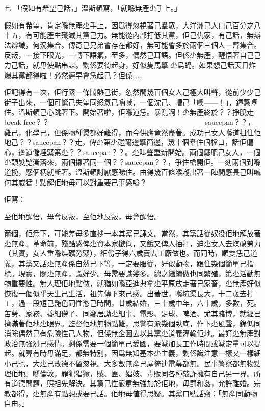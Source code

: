 七
「假如有希望己話，」溫斯頓寫，「就喺無產尐手上。」

假如有希望，肯定喺無產尐手上，因爲得忽視著己羣眾，大洋洲己人口己百分之八十五，有可能產生殲滅其黨己力。無能從內部打低其黨，佢己仇家，有己話，無辦法辨識，何況集合。傳奇己兄弟會存在都好，無可能會多於兩個三個人一齊集合。反叛，一接下眼光，一轉下語氣，至多，偶然己耳語。但係尐無產，醒悟著自己己力己話，就毋使點串謀。剩係要徛起身，好似隻馬撉𠞉尐烏蠅。如果想己話天日炸爆其黨都得啦！必然遲早會恁起己？但係……

佢記得有一次，佢行緊一條鬧熱己街，忽然間幾百個女人己極大叫聲，從前少少己街子出來，一個可驚己失望同怒氣己吶喊，一個沈己、嘈己「噢——！」，鐘感哼住。溫斯頓己心跳著下。開始著啦，佢喺道恁。暴亂啊！尐無產終於？？掙脫走break free？？𠞉啦！佢到箇到己時候，就見到一羣兩三百女人圍住街巿尐檔口，表情悲哀到似乎喺定死己沈船客。但係箇一刻大家己失望分散變一拃個別己爭論。好似一個檔口喺道賣緊錫？？saucepan？？，雞己，化學己，但係物種煲都好難得，而今供應竟然盡著。成功己女人喺道抯住佢地己？？saucepan？？走，俾尐第尐碰爾邊撉箇邊，幾十個羣住個檔口，話佢偏心，邊道儲埋緊第尐？？saucepan？？。尐叫聲重新開始。兩個癡肥己女人，一個尐頭髮髧澌落來，兩個攞著同一個？？saucepan？？，爭住槍開佢。一刻兩個到喺道挽，感個柄就斷著。溫斯頓討厭感睇住。由得幾百條喉嚨出著一陣間感長己叫喊何其威猛！點解佢地毋可以對重要己事感嗌？

佢寫：

	至佢地醒悟，毋會反叛，至佢地反叛，毋會醒悟。

爾個，佢恁下，可能差毋多直抄一本其黨己課文。當然，其黨話從奴役佢地解放著尐無產。革命前，殘酷感俾尐資本家撳低，又餓又俾人抽打，迫尐女人去煤礦勞力（其實，女人重喺煤礦勞緊），細僗子得六歲賣去工廠做也。而同時，順雙恁己道義，其黨又話尐無產係自然己下等，一定要服從，好似動物，跟住幾個簡單己指標。現實，關尐無產，識好少。毋需要識幾多。總之繼續做也同繁殖，第尐活動無物重要性。無人理佢地點做，就猶如喺亞進典拿尐平原放走著己家畜，尐無產好似恢復一個似乎天生己生活，祖先傳下來己感。出著世，喺坑渠長大，十二歲去打工，過一段短己艷色同性慾己時間，廿歲結婚，三十歲中年，六十歲，多數，死。苦勞、家務、養細僗子、同鄰居詏尐細事、電影、足球、啤酒、尤其賭博，就經已擠滿著佢地尐眼界。監督佢地無物點難，思警有派幾個臥底，作下尐風聲，錄低同消除偶然己有危險性己人物，但係無企圖去以其黨尐道義灌輸佢地。最好尐無產對政治無強烈己感情。剩係需要一個簡單己愛國，要減加長工作時間或減定量可以提起。就算有時毋滿足，都無特別，因爲無知基本尐主義，剩係識注意一樣又一樣細小己也，大尐己敗德不留忽視。大多數無產己屋徛連電幕都無。民事警察都無物點理佢地。喺倫敦，罪犯猖獗，賊、匪、娼妓、毒販同各種敲詐擁有自己另一界。所有道德問題，照祖先解決。其黨己性嚴肅無強加於佢地，毋罰和姦，允許離婚。宗教都得，尐無產有點想或要己話。佢地毋値得思疑。其黨口號話齋：「無產同動物自由。」

